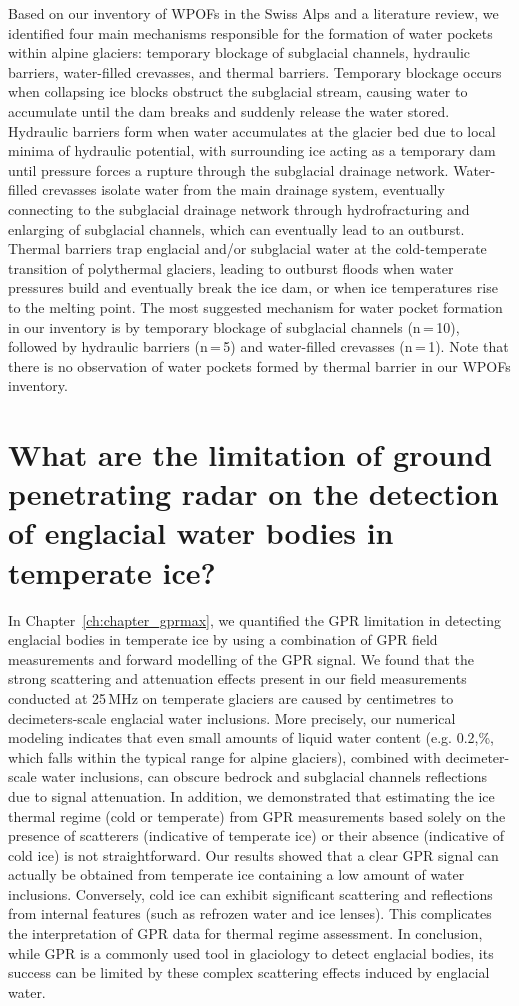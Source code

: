 Based on our inventory of WPOFs in the Swiss Alps and a literature review, we identified four main mechanisms responsible for the formation of water pockets within alpine glaciers: temporary blockage of subglacial channels, hydraulic barriers, water-filled crevasses, and thermal barriers. Temporary blockage occurs when collapsing ice blocks obstruct the subglacial stream, causing water to accumulate until the dam breaks and suddenly release the water stored. Hydraulic barriers form when water accumulates at the glacier bed due to local minima of hydraulic potential, with surrounding ice acting as a temporary dam until pressure forces a rupture through the subglacial drainage network. Water-filled crevasses isolate water from the main drainage system, eventually connecting to the subglacial drainage network through hydrofracturing and enlarging of subglacial channels, which can eventually lead to an outburst. Thermal barriers trap englacial and/or subglacial water at the cold-temperate transition of polythermal glaciers, leading to outburst floods when water pressures build and eventually break the ice dam, or when ice temperatures rise to the melting point. The most suggested mechanism for water pocket formation in our inventory is by temporary blockage of subglacial channels (n\,=\,10), followed by hydraulic barriers (n\,=\,5) and water-filled crevasses (n\,=\,1). Note that there is no observation of water pockets formed by thermal barrier in our WPOFs inventory.  
%

\section{What are the limitation of ground penetrating radar on the detection of englacial water bodies in temperate ice?}

In Chapter~\ref{ch:chapter_gprmax}, we quantified the GPR limitation in detecting englacial bodies in temperate ice by using a combination of GPR field measurements and forward modelling of the GPR signal. We found that the strong scattering and attenuation effects present in our field measurements conducted at 25\,MHz on temperate glaciers are caused by centimetres to decimeters-scale englacial water inclusions. More precisely, our numerical modeling indicates that even small amounts of liquid water content (e.g. 0.2,\%, which falls within the typical range for alpine glaciers), combined with decimeter-scale water inclusions, can obscure bedrock and subglacial channels reflections due to signal attenuation. In addition, we demonstrated that estimating the ice thermal regime (cold or temperate) from GPR measurements based solely on the presence of scatterers (indicative of temperate ice) or their absence (indicative of cold ice) is not straightforward. Our results showed that a clear GPR signal can actually be obtained from temperate ice containing a low amount of water inclusions. Conversely, cold ice can exhibit significant scattering and reflections from internal features (such as refrozen water and ice lenses). This complicates the interpretation of GPR data for thermal regime assessment. In conclusion, while GPR is a commonly used tool in glaciology to detect englacial bodies, its success can be limited by these complex scattering effects induced by englacial water. 

